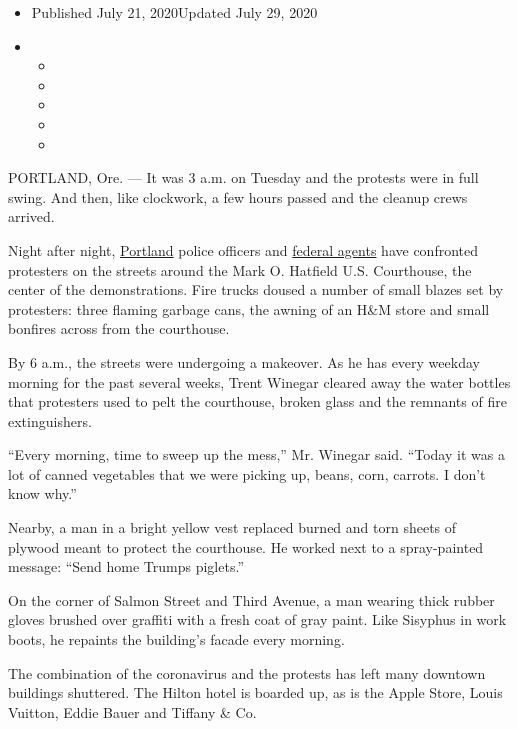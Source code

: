 \begin{itemize}
\item
  Published July 21, 2020Updated July 29, 2020
\item
  \begin{itemize}
  \item
  \item
  \item
  \item
  \item
  \end{itemize}
\end{itemize}

PORTLAND, Ore. --- It was 3 a.m. on Tuesday and the protests were in
full swing. And then, like clockwork, a few hours passed and the cleanup
crews arrived.

Night after night,
\href{https://www.nytimes.com/2020/07/29/us/protests-portland-federal-withdrawal.html}{Portland}
police officers and
\href{https://www.nytimes.com/2020/07/29/us/protests-portland-federal-withdrawal.html}{federal
agents} have confronted protesters on the streets around the Mark O.
Hatfield U.S. Courthouse, the center of the demonstrations. Fire trucks
doused a number of small blazes set by protesters: three flaming garbage
cans, the awning of an H\&M store and small bonfires across from the
courthouse.

By 6 a.m., the streets were undergoing a makeover. As he has every
weekday morning for the past several weeks, Trent Winegar cleared away
the water bottles that protesters used to pelt the courthouse, broken
glass and the remnants of fire extinguishers.

``Every morning, time to sweep up the mess,'' Mr. Winegar said. ``Today
it was a lot of canned vegetables that we were picking up, beans, corn,
carrots. I don't know why.''

Nearby, a man in a bright yellow vest replaced burned and torn sheets of
plywood meant to protect the courthouse. He worked next to a
spray-painted message: ``Send home Trumps piglets.''

On the corner of Salmon Street and Third Avenue, a man wearing thick
rubber gloves brushed over graffiti with a fresh coat of gray paint.
Like Sisyphus in work boots, he repaints the building's facade every
morning.

The combination of the coronavirus and the protests has left many
downtown buildings shuttered. The Hilton hotel is boarded up, as is the
Apple Store, Louis Vuitton, Eddie Bauer and Tiffany \& Co.

